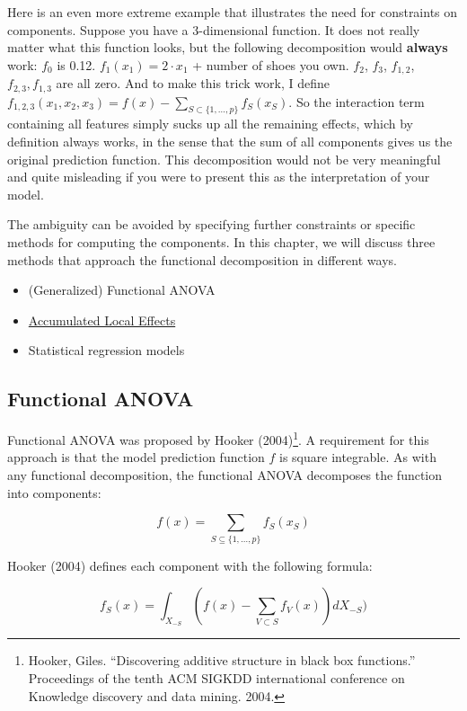 \documentclass[12pt,]{krantz}
\providecommand{\tightlist}{%
  \setlength{\itemsep}{0pt}\setlength{\parskip}{0pt}}
\begin{document}
Here is an even more extreme example that illustrates the need for
constraints on components. Suppose you have a 3-dimensional function. It
does not really matter what this function looks, but the following
decomposition would \textbf{always} work: \(f_0\) is 0.12.
\(f_1(x_1)=2\cdot{}x_1\) + number of shoes you own. \(f_2\), \(f_3\),
\(f_{1,2}\), \(f_{2,3}, f_{1,3}\) are all zero. And to make this trick
work, I define
\(f_{1,2,3}(x_1,x_2,x_3)=f(x)-\sum_{S\subset\{1,\ldots,p\}}f_S(x_S)\).
So the interaction term containing all features simply sucks up all the
remaining effects, which by definition always works, in the sense that
the sum of all components gives us the original prediction function.
This decomposition would not be very meaningful and quite misleading if
you were to present this as the interpretation of your model.

The ambiguity can be avoided by specifying further constraints or
specific methods for computing the components. In this chapter, we will
discuss three methods that approach the functional decomposition in
different ways.

\begin{itemize}
\tightlist
\item
  (Generalized) Functional ANOVA
\item
  \protect\hyperlink{ale}{Accumulated Local Effects}
\item
  Statistical regression models
\end{itemize}

\subsection{Functional ANOVA}\label{functional-anova}

Functional ANOVA was proposed by Hooker (2004)\footnote{Hooker, Giles.
  ``Discovering additive structure in black box functions.'' Proceedings
  of the tenth ACM SIGKDD international conference on Knowledge
  discovery and data mining. 2004.}. A requirement for this approach is
that the model prediction function \(f\) is square integrable. As with
any functional decomposition, the functional ANOVA decomposes the
function into components:

\[f(x) = \sum_{S\subseteq\{1,\ldots,p\}} f_S(x_S)\]

Hooker (2004) defines each component with the following formula:

\[f_S(x) = \int_{X_{-S}} \left( f(x) - \sum_{V \subset S} f_V(x)\right) d X_{-S})\]
\end{document}
